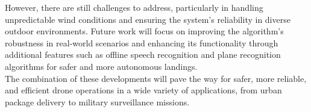 \documentclass[3p,times]{elsarticle}
\begin{document}
However, there are still challenges to address, particularly in handling unpredictable wind conditions and ensuring the system’s reliability in diverse outdoor environments. Future work will focus on improving the algorithm’s robustness in real-world scenarios and enhancing its functionality through additional features such as offline speech recognition and plane recognition algorithms for safer and more autonomous landings.\\

The combination of these developments will pave the way for safer, more reliable, and efficient drone operations in a wide variety of applications, from urban package delivery to military surveillance missions.

% 


\end{document}
